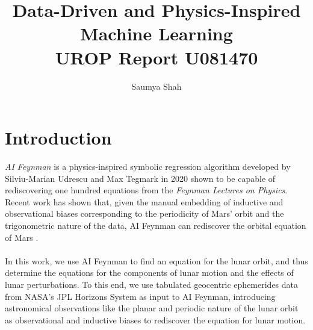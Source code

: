 \documentclass[fleqn,10pt]{olplainarticle}
\title{Data-Driven and Physics-Inspired Machine Learning\\[1ex] \large UROP Report U081470}
\author{Saumya Shah}
\numberwithin{equation}{subsection}
\begin{document}
\maketitle

\flushbottom

\thispagestyle{empty}

\tableofcontents

\section{Introduction}

\emph{AI Feynman} is a physics-inspired symbolic regression algorithm developed by Silviu-Marian Udrescu and Max Tegmark in 2020 \cite{Udrescu2020} shown to be capable of rediscovering one hundred equations from the \emph{Feynman Lectures on Physics}.
Recent work has shown that, given the manual embedding of inductive and observational biases corresponding to the periodicity of Mars' orbit and the trigonometric nature of the data, AI Feynman can rediscover the orbital equation of Mars \cite{Khoo2023.1}.\\\\
In this work, we use AI Feynman to find an equation for the lunar orbit, and thus determine the equations for the components of lunar motion and the effects of lunar perturbations. To this end, we use tabulated geocentric ephemerides data from NASA's JPL Horizons System as input to AI Feynman, introducing astronomical observations like the planar and periodic nature of the lunar orbit as observational and inductive biases to rediscover the equation for lunar motion. 
\\
\end{document}
